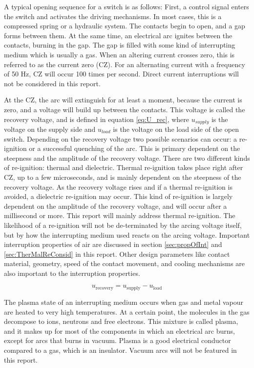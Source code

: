 \documentclass[10pt,b5paper,twoside]{article}
\begin{document}
A typical opening sequence for a switch is as follows: First, a control signal enters the switch and activates the driving mechanisms. In most cases, this is a compressed spring or a hydraulic system. The contacts begin to open, and a gap forms between them. At the same time, an electrical arc ignites between the contacts, burning in the gap. The gap is filled with some kind of interrupting medium which is usually a gas. When an altering current crosses zero, this is referred to as the current zero (CZ). For an alternating current with a frequency of 50 Hz, CZ will occur 100 times per second. Direct current interruptions will not be considered in this report.


At the CZ, the arc will extinguish for at least a moment, because the current is zero, and a voltage will build up between the contacts. This voltage is called the recovery voltage, and is defined in equation \eqref{eq:U_rec}, where $u_{supply}$ is the voltage on the supply side and $u_{load}$ is the voltage on the load side of the open switch. Depending on the recovery voltage two possible scenarios can occur: a re-ignition or a successful quenching of the arc. This is primary dependent on the steepness and the amplitude of the recovery voltage. There are two different kinds of re-ignition: thermal and dielectric. Thermal re-ignition takes place right after CZ, up to a few microseconds, and is mainly dependent on the steepness of the recovery voltage. As the recovery voltage rises and if a thermal re-ignition is avoided, a dielectric re-ignition may occur. This kind of re-ignition is largely dependent on the amplitude of the recovery voltage, and will occur after a millisecond or more. This report will mainly address thermal re-ignition. The likelihood of a re-ignition  will not be de-terminated by the arcing voltage itself, but by how the interrupting medium used reacts on the arcing voltage. Important interruption properties of air are discussed in section \ref{sec:propOfInt} and \ref{sec:TherMalReConsid} in this report. Other design parameters like contact material, geometry, speed of the contact movement, and cooling mechanisms are also important to the interruption properties.

\begin{equation} \label{eq:U_rec}
u_\mathrm{{recovery}}=u_\mathrm{{supply}}-u_\mathrm{{load}}
\end{equation}  

The plasma state of an interrupting medium occurs when gas and metal vapour are heated to very high temperatures. At a certain point, the molecules in the gas decompose to ions, neutrons and free electrons. This mixture is called plasma, and it makes up for most of the components in which an electrical arc burns, except for arcs that burns in vacuum. Plasma is a good electrical conductor compared to a gas, which is an insulator. Vacuum arcs will not be featured in this report.
\end{document}
